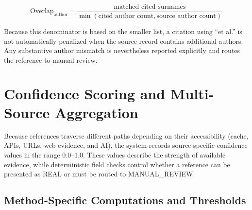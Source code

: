 \documentclass[12pt,a4paper,oneside]{report}
\begin{document}
\begin{equation}
\text{Overlap}_{\text{author}} = \frac{\text{matched cited surnames}}{\min(\text{cited author count},\text{source author count})}
\end{equation}

Because this denominator is based on the smaller list, a citation using ``et al.'' is not automatically penalized when the source record contains additional authors. Any substantive author mismatch is nevertheless reported explicitly and routes the reference to manual review.

\section{Confidence Scoring and Multi-Source Aggregation}

Because references traverse different paths depending on their accessibility (cache, APIs, URLs, web evidence, and AI), the system records source-specific confidence values in the range 0.0--1.0. These values describe the strength of available evidence, while deterministic field checks control whether a reference can be presented as REAL or must be routed to MANUAL\_REVIEW.

\subsection{Method-Specific Computations and Thresholds}
\end{document}
